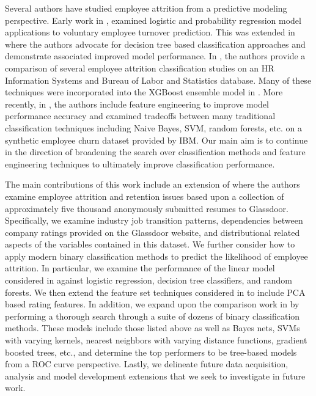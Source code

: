 \documentclass[10pt]{article}
\begin{document}
Several authors have studied employee attrition from a predictive modeling perspective.  Early work in 
\cite{Hong}, examined logistic and probability regression model applications to voluntary 
employee turnover prediction.  This was extended in 
\cite{Alao2013,Jantan} where the authors advocate for 
decision tree based classification approaches and demonstrate associated improved model performance.
In \cite{Saradhi2011}, the authors provide a comparison of several employee attrition 
classification studies on an HR Information Systems and 
Bureau of Labor and Statistics database.  Many of these techniques were 
incorporated into the XGBoost ensemble model in \cite{Punnoose}.
More recently, in \cite{Yigit2017}, the authors include feature engineering to improve model performance 
accuracy and examined tradeoffs between
many traditional classification techniques including Naive Bayes, SVM, random forests, etc. on 
a synthetic employee churn dataset provided by IBM.  Our main aim is to continue in the 
direction of broadening the search over classification methods and feature engineering techniques 
to ultimately improve classification performance.

The main contributions of this work include an extension of \cite{Smart2016} where the authors 
examine employee 
attrition and retention issues based upon 
a collection of approximately five thousand anonymously submitted resumes to Glassdoor.  
Specifically, we examine industry job transition patterns, dependencies between company ratings 
provided on the Glassdoor website, and distributional related aspects of the variables 
contained in this dataset.  We further consider how to apply modern binary classification 
methods to predict the likelihood of employee attrition.  In particular, we examine the 
performance of the linear model considered in \cite{Smart2016, Fri2018, Naga} against logistic regression, 
decision tree classifiers, and random forests.  We then extend the feature set techniques considered in
\cite{Yigit2017} to include PCA based rating features. In addition, we expand upon the 
comparison work in \cite{Saradhi2011,Punnoose} by performing a thorough search through 
a suite of dozens of binary classification methods.  These models include those listed above as 
well as Bayes nets, SVMs with varying kernels, nearest neighbors with varying distance 
functions, gradient boosted trees, etc., and  determine 
the top performers to be tree-based models from a ROC curve perspective.
 Lastly, we delineate 
future data acquisition, analysis and model development extensions that we seek to investigate 
in future work.  
\end{document}
